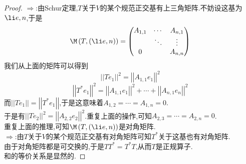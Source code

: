 \documentclass{ctexart}
\begin{document}
\begin{proof}
    $\Rightarrow$:由Schur定理,$T$关于$V$的某个规范正交基有上三角矩阵.不妨设这基为$\li e,n$,于是
    \[\M\left(T,\left(\li e,n\right)\right)=\begin{pmatrix}
        A_{1,1} & \cdots & A_{n,1} \\
         & \ddots & \vdots \\
        0 & & A_{n,n}
    \end{pmatrix}\]
    我们从上面的矩阵可以得到
    \[\left|\left|Te_1\right|\right|^2=\left|\left|A_{1,1}e_1\right|\right|^2\]
    \[\left|\left|T^*e_1\right|\right|^2=\left|\left|A_{1,1}e_1\right|\right|^2+\cdots+\left|\left|A_{n,1}e_n\right|\right|^2\]
    而$\left|\left|Te_1\right|\right|=\left|\left|T^*e_1\right|\right|$,于是这意味着$A_{1,2}=\cdots=A_{1,n}=0$.\\
    于是有$\left|\left|Te_2\right|\right|^2=\left|\left|A_{2,2}e_2\right|\right|^2$.重复上面的操作,可知$A_{2,3}=\cdots=A_{2,n}=0$.\\
    重复上面的推理,可知$\M\left(T,\left(\li e,n\right)\right)$是对角矩阵.\\
    $\Rightarrow$:由$T$关于$V$的某个规范正交基有对角矩阵可知$T^*$关于这基也有对角矩阵.\\
    由于对角矩阵都是可交换的,于是$TT^*=T^*T$,从而$T$是正规算子.\\
    和的等价关系是显然的.
\end{proof}
\end{document}
